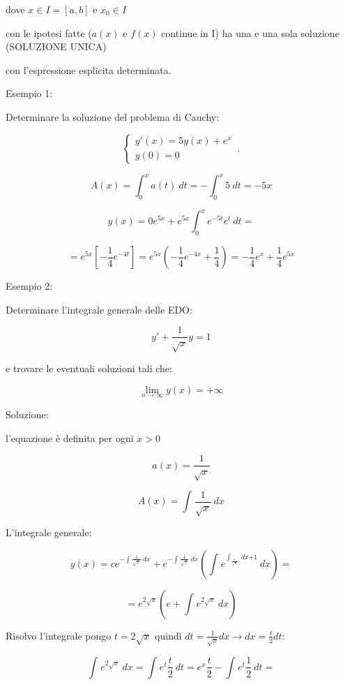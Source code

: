 \documentclass[11pt]{article}
\begin{document}
dove $x \in I = [a,b]$ e $x_0 \in I$

con le ipotesi fatte ($a(x)$ e $f(x)$ continue in I) ha una e una sola soluzione (SOLUZIONE UNICA)

con l'espressione esplicita determinata.

Esempio 1:

Determinare la soluzione del problema di Cauchy:

\begin{equation}
    \begin{cases}
      y'(x)=5y(x) + e ^{x}\\
      y(0)=0
    \end{cases}\,.
\end{equation}

\[
    A(x)=\int_{{0}}^{{x}} {a(t)} \: d{t} {}= - \int_{{0}}^{{x}} {5} \: d{t} {}= -5x
\]

\[
    y(x)=0e ^{5x} + e ^{5x}\int_{{0}}^{{x}} {e ^{-5t}e ^{t}} \: d{t} {}=
\]

\[
    = e ^{5x} [ -\frac{1}{4} e ^{-4t}] = e ^{5x}(-\frac{1}{4} e ^{-4x}+\frac{1}{4})= - \frac{1}{4} e ^{x}+ \frac{1}{4} e ^{5x}
\]

Esempio 2:

Determinare l'integrale generale delle EDO:

\[
    y'+\frac{1}{\sqrt{x}} y=1
\]

e trovare le eventuali soluzioni tali che:

\[
    \lim_{n \to \infty} y(x) = +\infty
\]

Soluzione: 

l'equazione è definita per ogni $x>0$

\[
    a(x) = \frac{1}{\sqrt{x}} 
\]

\[
    A(x) = \int_{{}}^{{}} {\frac{1}{\sqrt{x}} } \: d{x} {}
\]


L'integrale generale:

\[
    y(x) = c e ^{-\int_{{}}^{{}} {\frac{1}{\sqrt{x}} } \: d{x} {}}+ e ^{-\int_{{}}^{{}} {\frac{1}{\sqrt{x}} } \: d{x} {}}( \int_{{}}^{{}} {e ^{\int_{{\frac{1}{\sqrt{x}} }}^{{}} {} \: d{x} {+1}}} \: d{x} {})=
\]

\[
    =e ^{2 \sqrt{x}} (e+ \int_{{}}^{{}} {e ^{2\sqrt{x}}} \: d{x} {})
\]

Risolvo l'integrale pongo $t = 2 \sqrt{x}$ quindi $ dt = \frac{1}{\sqrt{x}}dx \rightarrow dx = \frac{t}{2} dt $:

\[
    \int_{{}}^{{}} {e ^{2 \sqrt{x}}} \: d{x} {}= \int_{{}}^{{}} {e ^{t}\frac{t}{2} } \: d{t} {} = e ^{x}\frac{t}{2} - \int_{{}}^{{}} {e ^{t}\frac{1}{2} } \: d{t} {}=
\]
\end{document}
